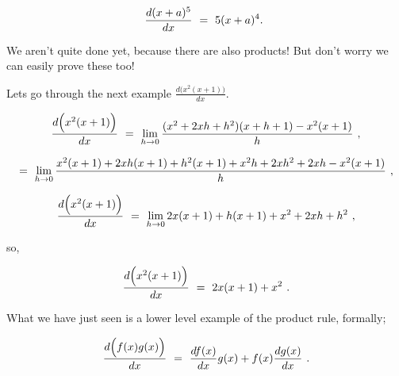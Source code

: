 \documentclass{article}
\begin{document}
\begin{equation} \label{eb-eq-321-1}
\frac{d (x + a)^5}{dx} \hspace{0.125cm} = \hspace{0.125cm} 5(x + a)^4 . \hspace{0.125cm}
\end{equation}

We aren't quite done yet, because there are also products! But don't worry we can easily prove these too!

Lets go through the next example   \begin{math} \frac{d \Big( x^2(x + 1)\Big)}{dx} \end{math}.

\begin{equation} \label{eb-eq-322-1}
\frac{d \Big( x^2(x + 1)\Big)}{dx} \hspace{0.125cm} = \hspace{0.125cm} \lim_{h\to0} \frac{(x^2 + 2xh + h^2)(x + h + 1) - x^2(x + 1)}{h} \hspace{0.125cm} ,
\end{equation}

\begin{equation} \label{eb-eq-323-1}
= \hspace{0.125cm} \lim_{h\to0} \frac{x^2(x + 1) + 2xh(x + 1) + h^2(x + 1) + x^2 h + 2x h^2 + 2xh - x^2(x + 1)}{h} \hspace{0.125cm} ,
\end{equation}

\begin{equation} \label{eb-eq-324-1}
\frac{d \Big( x^2(x + 1) \Big)}{dx} \hspace{0.125cm} = \hspace{0.125cm} \lim_{h\to0} 2x(x + 1) + h(x + 1) + x^2 + 2x h + h^2 \hspace{0.125cm} , 
\end{equation}

so,

\begin{equation} \label{eb-eq-325-1}
\frac{d \Big( x^2(x + 1)\Big)}{dx} \hspace{0.125cm} = \hspace{0.125cm} 2x(x + 1) + x^2 \hspace{0.125cm} .
\end{equation}

What we have just seen is a lower level example of the product rule, formally;

\begin{equation} \label{eb-eq-326-1}
\frac{d \Big( f(x) g(x) \Big)}{dx} \hspace{0.125cm} = \hspace{0.125cm} \frac{d f(x)}{dx}g(x) + f(x)\frac{d g(x)}{dx} \hspace{0.125cm} .
\end{equation}
\end{document}

